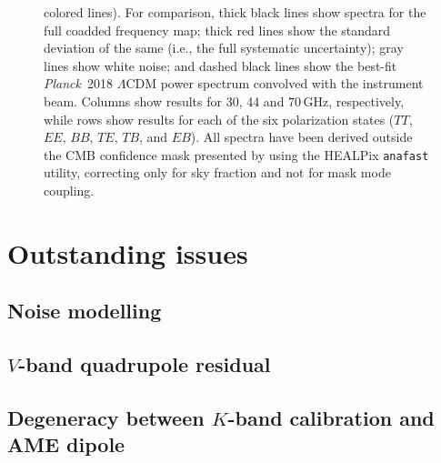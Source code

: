 \documentclass[twocolumn]{../../common/aa}
\def\Planck{\emph{Planck}}
\begin{document}
\begin{figure}
{{      colored lines}). For comparison, thick black lines show spectra
    for the full coadded frequency map; thick red lines show the
    standard deviation of the same (i.e., the full systematic
    uncertainty); gray lines show white noise; and dashed black lines
    show the best-fit \Planck\ 2018 $\Lambda$CDM power spectrum
    convolved with the instrument beam. Columns show results for 30,
    44 and 70\,GHz, respectively, while rows show results for each of
    the six polarization states ($TT$, $EE$, $BB$, $TE$, $TB$, and
    $EB$). All spectra have been derived outside the CMB confidence
    mask presented by \citet{bp13} using the HEALPix \texttt{anafast}
    utility, correcting only for sky fraction and not for mask mode
    coupling. }
  \label{fig:corrmap_powspec_stddev}
\end{figure}

















\clearpage
\section{Outstanding issues}
\label{sec:issues}


\subsection{Noise modelling}
\label{sec:noisemodel}


\subsection{$V$-band quadrupole residual}
\label{sec:quadres}


\subsection{Degeneracy between $K$-band calibration and AME dipole}
\label{sec:quadres}
\end{document}
